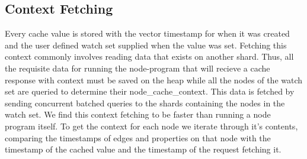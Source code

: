 \documentclass[letterpaper,twocolumn,11pt,tight]{article}
\begin{document}
\subsection{Context Fetching}
Every cache value is stored with the vector timestamp for when it was created and the user defined watch set supplied when the value was set. Fetching this context commonly involves reading data that exists on another shard. Thus, all the requisite data for running the node-program that will recieve a cache response with context must be saved on the heap while all the nodes of the watch set are queried to determine their node\_cache\_context.
This data is fetched by sending concurrent batched queries to the shards containing the nodes in the watch set. We find this context fetching to be faster than running a node program itself. To get the context for each node we iterate through it's contents, comparing the timestamps of edges and properties on that node with the timestamp of the cached value and the timestamp of the request fetching it. %
\end{document}
